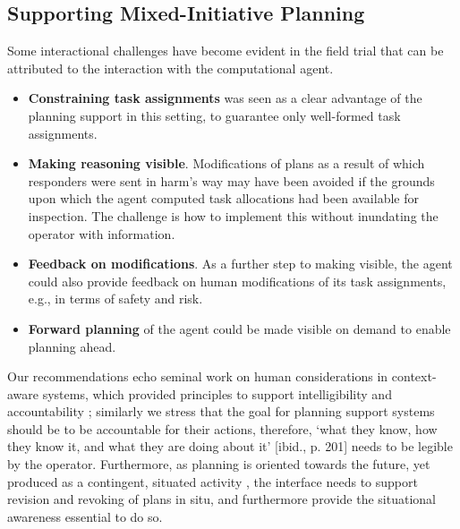 \subsection{Supporting Mixed-Initiative Planning} 
Some interactional challenges have become evident in the field trial that can be attributed to the interaction with the computational agent.\\
\begin{itemize}
\item  \textbf{Constraining task assignments} was seen as a clear advantage of the planning support in this setting, to guarantee only well-formed task assignments.
\item \textbf{Making reasoning visible}. Modifications of plans as a result of which responders were sent in harm's way may have been avoided if the grounds upon which the agent computed task allocations had been available for inspection. The challenge is how to implement this without inundating the operator with information.
\item \textbf{Feedback on modifications}. As a further step to making visible, the agent could also provide feedback on human modifications of its task assignments, e.g., in terms of safety and risk.
\item \textbf{Forward planning} of the agent could be made visible on demand to enable planning ahead. 
\end{itemize}

Our recommendations echo seminal work on human considerations in context-aware systems, which provided principles to support intelligibility and accountability \citep{Bellotti2001}; similarly we stress that the goal for planning support systems should be  to be accountable for their actions, therefore, `what they know, how they know it, and what they are doing about it' [ibid., p. 201] needs to be legible by the operator. Furthermore, as planning is oriented towards the future, yet produced as a contingent, situated activity \citep{Suchman1987}, the interface needs to support revision and revoking of plans in situ, and furthermore provide the situational awareness essential to do so.  

